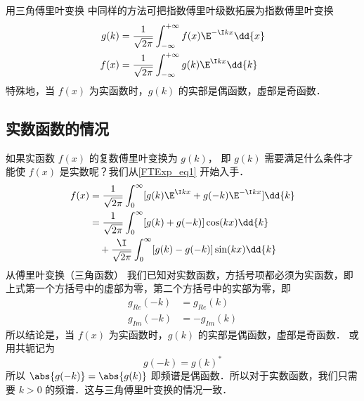 
\begin{issues}
\issueAbstract
\end{issues}


用三角傅里叶变换  中同样的方法可把指数傅里叶级数拓展为指数傅里叶变换
\begin{align}
g(k) &= \frac{1}{\sqrt{2\pi }} \int_{-\infty }^{+\infty } f(x)\E^{-\I kx} \dd{x} \\
f(x) &= \frac{1}{\sqrt{2\pi }} \int_{-\infty }^{+\infty } g(k)\E^{\I kx} \dd{k} \label{FTExp_eq1}
\end{align}
特殊地，当 $f(x)$ 为实函数时，$g(k)$ 的实部是偶函数，虚部是奇函数．

\subsection{实数函数的情况}

如果实函数 $f(x)$ 的复数傅里叶变换为 $g(k)$， 即 $g(k)$ 需要满足什么条件才能使 $f(x)$ 是实数呢？我们从\autoref{FTExp_eq1} 开始入手．
\begin{equation}\begin{aligned}
f(x) &= \frac{1}{\sqrt{2\pi }} \int_0^\infty [g(k)\E^{\I kx} + g(-k)\E^{-\I kx}] \dd{k} \\
&= \frac{1}{\sqrt{2\pi }} \int_0^\infty [g(k)+g(-k)]\cos(kx)\dd{k}\\
&\quad + \frac{\I}{\sqrt{2\pi }} \int_0^\infty [g(k)-g(-k)]\sin(kx) \dd{k}
\end{aligned}\end{equation}
从傅里叶变换（三角函数）%
我们已知对实数函数，方括号项都必须为实函数，即上式第一个方括号中的虚部为零，第二个方括号中的实部为零，即
\begin{equation}\begin{aligned}
g_{Re}(-k) &= g_{Re}(k)\\
g_{Im}(-k) &= -g_{Im}(k)
\end{aligned}\end{equation}
所以结论是，当 $f(x)$ 为实函数时，$g(k)$ 的实部是偶函数，虚部是奇函数． 或用共轭记为
\begin{equation}\label{FTExp_eq5}
g(-k) = g(k)^*
\end{equation}
所以 $\abs{g(-k)} = \abs{g(k)}$ 即频谱是偶函数．所以对于实数函数，我们只需要 $k>0$ 的频谱．这与三角傅里叶变换的情况一致．

